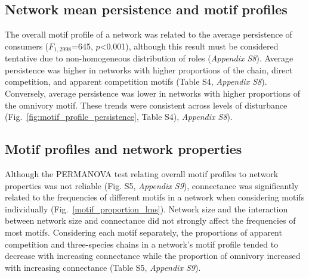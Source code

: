\documentclass[12pt]{article}
\begin{document}
\begin{spacing}{2.0}
    \subsection*{Network mean persistence and motif profiles}
        The overall motif profile of a network was related to the average persistence of consumers ($F_{1,2998}$=645, $p$\textless0.001), although this result must be considered tentative due to non-homogeneous distribution of roles (\emph{Appendix S8}). 
        Average persistence was higher in networks with higher proportions of the chain, direct competition, and apparent competition motifs (Table S4, \emph{Appendix S8}). 
        Conversely, average persistence was lower in networks with higher proportions of the omnivory motif. 
        These trends were consistent across levels of disturbance (Fig.~\ref{fig:motif_profile_persistence}, Table S4), \emph{Appendix S8}).%


    \subsection*{Motif profiles and network properties}

        Although the PERMANOVA test relating overall motif profiles to network properties was not reliable (Fig. S5, \emph{Appendix S9}), 
        connectance was significantly related to the frequencies of different motifs in a network when considering motifs individually (Fig.~\ref{motif_proportion_lms}).
        Network size and the interaction between network size and connectance did not strongly affect the frequencies of most motifs.
        Considering each motif separately, the proportions of apparent competition and three-species chains in a network's motif profile tended to decrease with increasing connectance while the proportion of omnivory increased with increasing connectance (Table S5, \emph{Appendix S9}). 
    










\end{spacing}
\end{document}
